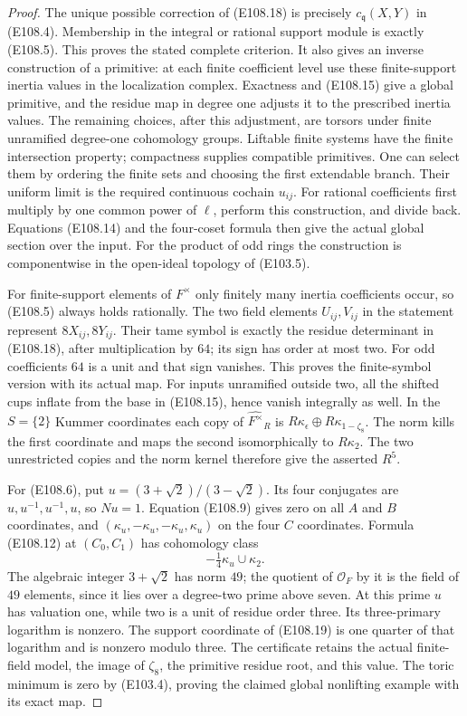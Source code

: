 \begin{proof}
The unique possible correction of (E108.18) is precisely
$c_{\mathfrak q}(X,Y)$ in (E108.4).  Membership in the
integral or rational support module is exactly (E108.5).
This proves the stated complete criterion.  It also gives
an inverse construction of a primitive: at each finite
coefficient level use these finite-support inertia values
in the localization complex.  Exactness and (E108.15)
give a global primitive, and the residue map in degree
one adjusts it to the prescribed inertia values.  The
remaining choices, after this adjustment, are torsors
under finite unramified degree-one cohomology groups.
Liftable finite systems have the finite intersection
property; compactness supplies compatible primitives.
One can select them by ordering the finite sets and
choosing the first extendable branch.  Their uniform
limit is the required continuous cochain $u_{ij}$.
For rational coefficients first multiply by one common
power of $\ell$, perform this construction, and divide
back.  Equations (E108.14) and the four-coset formula
then give the actual global section over the input.
For the product of odd rings the construction is
componentwise in the open-ideal topology of (E103.5).

For finite-support elements of $F^\times$ only finitely
many inertia coefficients occur, so (E108.5) always holds
rationally.  The two field elements $U_{ij},V_{ij}$ in the
statement represent $8X_{ij},8Y_{ij}$.  Their tame symbol
is exactly the residue determinant in (E108.18), after
multiplication by $64$; its sign has order at most two.
For odd coefficients $64$ is a unit and that sign vanishes.
This proves the finite-symbol version with its actual map.
For inputs unramified outside two, all the
shifted cups inflate from the base in (E108.15), hence
vanish integrally as well.  In the $S=\{2\}$ Kummer
coordinates each copy of $\widehat{F^\times}_R$ is
$R\kappa_\epsilon\oplus R\kappa_{1-\zeta_8}$.
The norm kills the first coordinate and maps the second
isomorphically to $R\kappa_2$.  The two unrestricted copies
and the norm kernel therefore give the asserted $R^5$.

For (E108.6), put $u=(3+\sqrt2)/(3-\sqrt2)$.
Its four conjugates are $u,u^{-1},u^{-1},u$, so $Nu=1$.
Equation (E108.9) gives zero on all $A$ and $B$ coordinates,
and $(\kappa_u,-\kappa_u,-\kappa_u,\kappa_u)$ on the
four $C$ coordinates.  Formula (E108.12) at $(C_0,C_1)$
has cohomology class
\[
                         -\tfrac14\kappa_u\cup\kappa_2.
 \tag{E108.19}
\]
The algebraic integer $3+\sqrt2$ has norm $49$; the quotient
of $\mathcal O_F$ by it is the field of $49$ elements,
since it lies over a degree-two prime above seven.
At this prime $u$ has valuation one, while two is a unit
of residue order three.  Its three-primary logarithm is
nonzero.  The support coordinate of (E108.19) is one
quarter of that logarithm and is nonzero modulo three.
The certificate retains the actual finite-field model,
the image of $\zeta_8$, the primitive residue root, and
this value.  The toric minimum is zero by (E103.4), proving
the claimed global nonlifting example with its exact map.


\end{proof}
